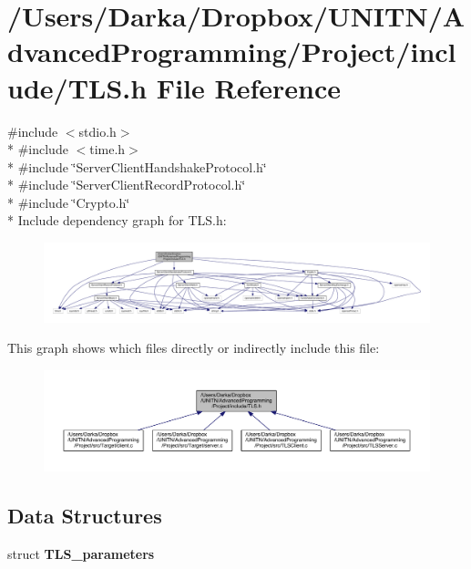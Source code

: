 \section{/\+Users/\+Darka/\+Dropbox/\+U\+N\+I\+T\+N/\+Advanced\+Programming/\+Project/include/\+T\+LS.h File Reference}
\label{_t_l_s_8h}
{\ttfamily \#include $<$stdio.\+h$>$}\\*
{\ttfamily \#include $<$time.\+h$>$}\\*
{\ttfamily \#include \char`\"{}Server\+Client\+Handshake\+Protocol.\+h\char`\"{}}\\*
{\ttfamily \#include \char`\"{}Server\+Client\+Record\+Protocol.\+h\char`\"{}}\\*
{\ttfamily \#include \char`\"{}Crypto.\+h\char`\"{}}\\*
Include dependency graph for T\+L\+S.\+h\+:\nopagebreak
\begin{figure}[H]
\begin{center}
\leavevmode
\includegraphics[width=350pt]{_t_l_s_8h__incl}
\end{center}
\end{figure}
This graph shows which files directly or indirectly include this file\+:\nopagebreak
\begin{figure}[H]
\begin{center}
\leavevmode
\includegraphics[width=350pt]{_t_l_s_8h__dep__incl}
\end{center}
\end{figure}
\subsection*{Data Structures}
\begin{DoxyCompactItemize}
\item 
struct {\bf T\+L\+S\+\_\+parameters}
\end{DoxyCompactItemize}
